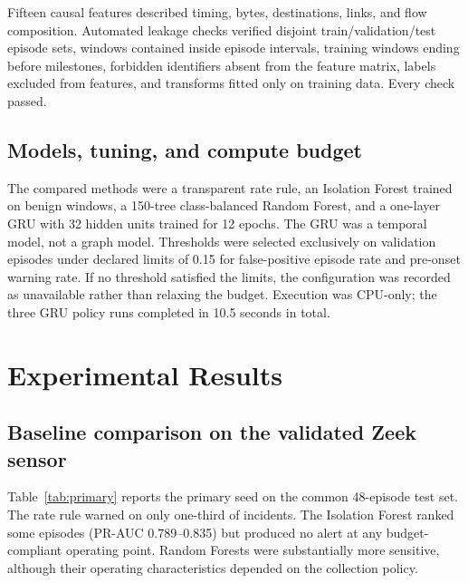 \documentclass[10pt,a4paper]{article}
\begin{document}
Fifteen causal features described timing, bytes, destinations, links, and flow composition. Automated leakage checks verified disjoint train/validation/test episode sets, windows contained inside episode intervals, training windows ending before milestones, forbidden identifiers absent from the feature matrix, labels excluded from features, and transforms fitted only on training data. Every check passed.

\subsection{Models, tuning, and compute budget}

The compared methods were a transparent rate rule, an Isolation Forest trained on benign windows, a 150-tree class-balanced Random Forest, and a one-layer GRU with 32 hidden units trained for 12 epochs. The GRU was a temporal model, not a graph model. Thresholds were selected exclusively on validation episodes under declared limits of 0.15 for false-positive episode rate and pre-onset warning rate. If no threshold satisfied the limits, the configuration was recorded as unavailable rather than relaxing the budget. Execution was CPU-only; the three GRU policy runs completed in 10.5 seconds in total.

\section{Experimental Results}

\subsection{Baseline comparison on the validated Zeek sensor}

Table~\ref{tab:primary} reports the primary seed on the common 48-episode test set. The rate rule warned on only one-third of incidents. The Isolation Forest ranked some episodes (PR-AUC 0.789--0.835) but produced no alert at any budget-compliant operating point. Random Forests were substantially more sensitive, although their operating characteristics depended on the collection policy.
\end{document}
